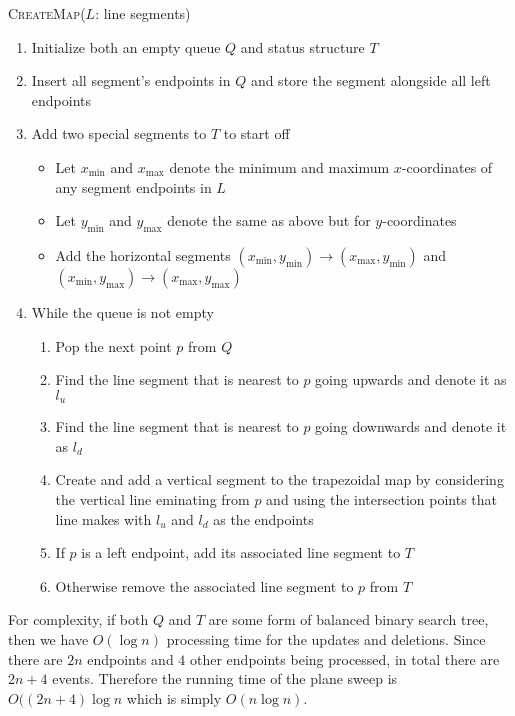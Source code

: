 \documentclass[12pt]{extarticle}
\begin{document}
\begin{solution}
    \begin{algorithm}[H]
        \caption{\textsc{CreateMap}($L$: line segments)}
        \begin{enumerate}
            \item Initialize both an empty queue $Q$ and status structure $T$
            \item Insert all segment's endpoints in $Q$ and store the segment alongside all left endpoints
            \item Add two special segments to $T$ to start off
                \begin{itemize}
                    \item Let $x_\text{min}$ and $x_\text{max}$ denote the minimum and maximum $x$-coordinates of any segment endpoints in $L$
                    \item Let $y_\text{min}$ and $y_\text{max}$ denote the same as above but for $y$-coordinates
                    \item Add the horizontal segments $(x_\text{min}, y_\text{min}) \rightarrow (x_\text{max}, y_\text{min})$ and $(x_\text{min}, y_\text{max}) \rightarrow (x_\text{max}, y_\text{max})$
                \end{itemize}
            \item While the queue is not empty
                \begin{enumerate}
                    \item Pop the next point $p$ from $Q$
                    \item Find the line segment that is nearest to $p$ going upwards and denote it as $l_u$
                    \item Find the line segment that is nearest to $p$ going downwards and denote it as $l_d$
                    \item Create and add a vertical segment to the trapezoidal map by considering the vertical line eminating from $p$ and using the intersection points that line makes with $l_u$ and $l_d$ as the endpoints
                    \item If $p$ is a left endpoint, add its associated line segment to $T$
                    \item Otherwise remove the associated line segment to $p$ from $T$
                \end{enumerate}
        \end{enumerate}
    \end{algorithm}

    For complexity, if both $Q$ and $T$ are some form of balanced binary search tree, then we have $O(\log n)$ processing time for the updates and deletions. Since there are $2n$ endpoints and $4$ other endpoints being processed, in total there are $2n + 4$ events. Therefore the running time of the plane sweep is $O((2n+4) \log n$ which is simply $O(n \log n)$.
\end{solution}
\end{document}
